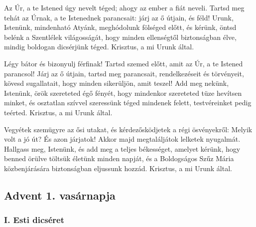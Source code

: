 \documentclass[twoside]{article}
\begin{document}
Az Úr, a te Istened úgy nevelt téged; ahogy az ember a fiát neveli. Tartsd meg tehát az Úrnak, a te Istenednek parancsait: járj az ő útjain, és féld!
Urunk, Istenünk, mindenható Atyánk, meghódolunk fölséged előtt, és kérünk, öntsd belénk a Szentlélek világosságát, hogy minden ellenségtől biztonságban élve, mindig boldogan dicsérjünk téged. Krisztus, a mi Urunk által.

Légy bátor és bizonyulj férfinak! Tartsd szemed előtt, amit az Úr, a te Istened parancsol! Járj az ő útjain, tartsd meg parancsait, rendelkezéseit és törvényeit, kövesd sugallatait, hogy minden sikerüljön, amit teszel!
Add meg nekünk, Istenünk, örök szereteted égő fényét, hogy mindenkor szereteted tüze hevítsen minket, és osztatlan szívvel szeressünk téged mindenek felett, testvéreinket pedig teérted. Krisztus, a mi Urunk által.

Vegyétek szemügyre az ősi utakat, és kérdezősködjetek a régi ösvényekről: Melyik volt a jó út? És azon járjatok! Akkor majd megtaláljátok lelketek nyugalmát.
Hallgass meg, Istenünk, és add meg a teljes békességet, amelyet kérünk, hogy benned örülve töltsük életünk minden napját, és a Boldogságos Szűz Mária közbenjárására biztonságban eljussunk hozzád. Krisztus, a mi Urunk által.

\subsection*{Advent 1. vasárnapja}
\subsubsection*{I. Esti dicséret}

\end{document}
